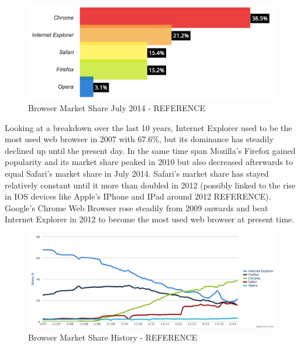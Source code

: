 \documentclass[a4paper,11pt,titlepage]{article}
\begin{document}
\begin{figure}[ht!]
\centering
\includegraphics[width=170mm]{graphics/webStats_01.png}
\caption{Browser Market Share July 2014 - REFERENCE}
\label{fig:UIdesign1}
\end{figure}

Looking at a breakdown over the last 10 years, Internet Explorer used to be the most used web browser in 2007 with 67.6\%, but its dominance has steadily declined up until the present day. In the same time span Mozilla's Firefox gained popularity and its market share peaked in 2010 but also decreased afterwards to equal Safari's market share in July 2014. Safari's market share has stayed relatively constant until it more than doubled in 2012 (possibly linked to the rise in IOS devices like Apple's IPhone and IPad around 2012 REFERENCE). Google's Chrome Web Browser rose steadily from 2009 onwards and beat Internet Explorer in 2012 to become the most used web browser at present time.

\begin{figure}[ht!]
\centering
\includegraphics[width=170mm]{graphics/webStats_02.png}
\caption{Browser Market Share History - REFERENCE}
\label{fig:UIdesign1}
\end{figure}
\end{document}

